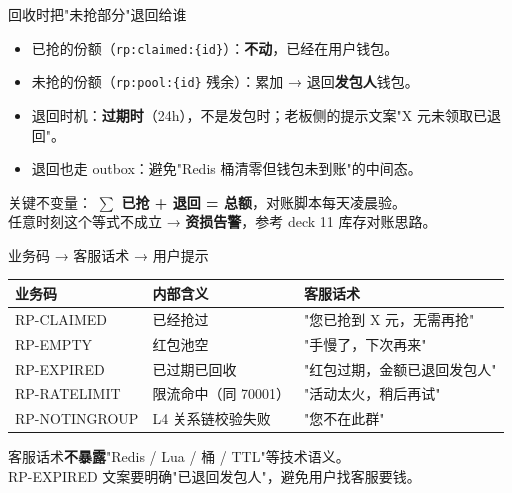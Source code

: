 \begin{frame}{回收时把"未抢部分"退回给谁}
\begin{itemize}
  \item 已抢的份额（\texttt{rp:claimed:\{id\}}）：\textbf{不动}，已经在用户钱包。
  \item 未抢的份额（\texttt{rp:pool:\{id\}} 残余）：累加 → 退回\textbf{发包人}钱包。
  \item 退回时机：\textbf{过期时}（24h），不是发包时；老板侧的提示文案"X 元未领取已退回"。
  \item 退回也走 outbox：避免"Redis 桶清零但钱包未到账"的中间态。
\end{itemize}
\vspace{2mm}
\small 关键不变量：\textbf{ $\sum$ 已抢 + 退回 = 总额}，对账脚本每天凌晨验。\\
任意时刻这个等式不成立 → \textbf{资损告警}，参考 deck 11 库存对账思路。
\end{frame}

\begin{frame}{业务码 → 客服话术 → 用户提示}
\begin{tabular}{@{}lll@{}}
\toprule
业务码         & 内部含义              & 客服话术 \\
\midrule
RP-CLAIMED     & 已经抢过              & "您已抢到 X 元，无需再抢" \\
RP-EMPTY       & 红包池空              & "手慢了，下次再来" \\
RP-EXPIRED     & 已过期已回收          & "红包过期，金额已退回发包人" \\
RP-RATELIMIT   & 限流命中（同 70001）  & "活动太火，稍后再试" \\
RP-NOTINGROUP  & L4 关系链校验失败     & "您不在此群" \\
\bottomrule
\end{tabular}
\vspace{2mm}
\small 客服话术\textbf{不暴露}"Redis / Lua / 桶 / TTL"等技术语义。\\
RP-EXPIRED 文案要明确"已退回发包人"，避免用户找客服要钱。
\end{frame}

